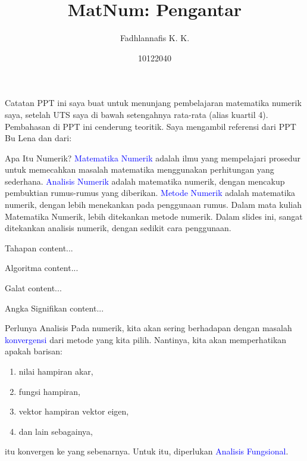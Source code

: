 \documentclass[xcolor={dvipsnames}, 9pt]{beamer}
\title{MatNum: Pengantar}
\author{Fadhlannafis K. K.}
\date{10122040}
\newcommand{\emp}[1]{\textcolor{Blue}{#1}}
\begin{document}
	\begin{frame}[plain]
		\maketitle
	\end{frame}
	\begin{frame}{Catatan}
		PPT ini saya buat untuk menunjang pembelajaran matematika numerik saya, setelah UTS saya di bawah setengahnya rata-rata (alias kuartil 4). \newline
		Pembahasan di PPT ini cenderung teoritik. Saya mengambil referensi dari PPT Bu Lena dan dari:
		\nocite{*}
		\printbibliography
	\end{frame}
	\begin{frame}{Apa Itu Numerik?}
		\emp{Matematika Numerik} adalah ilmu yang mempelajari prosedur untuk memecahkan masalah matematika menggunakan perhitungan yang sederhana. \newline
		\emp{Analisis Numerik} adalah matematika numerik, dengan mencakup pembuktian rumus-rumus yang diberikan. \newline
		\emp{Metode Numerik} adalah matematika numerik, dengan lebih menekankan pada penggunaan rumus. \newline
        Dalam mata kuliah Matematika Numerik, lebih ditekankan metode numerik. \newline
        Dalam slides ini, sangat ditekankan analisis numerik, dengan sedikit cara penggunaan.
	\end{frame}
	\begin{frame}{Tahapan}
		content...
	\end{frame}
	\begin{frame}{Algoritma}
		content...
	\end{frame}
	\begin{frame}{Galat}
		content...
	\end{frame}
	\begin{frame}{Angka Signifikan}
		content...
	\end{frame}
	\begin{frame}{Perlunya Analisis}
		Pada numerik, kita akan sering berhadapan dengan masalah \emp{konvergensi} dari metode yang kita pilih. \newline
		Nantinya, kita akan memperhatikan apakah barisan:
		\begin{enumerate}
			\item nilai hampiran akar,
			\item fungsi hampiran,
			\item vektor hampiran vektor eigen,
			\item dan lain sebagainya,
		\end{enumerate}
		itu konvergen ke yang sebenarnya. Untuk itu, diperlukan \emp{Analisis Fungsional}.
	\end{frame}
\end{document}
